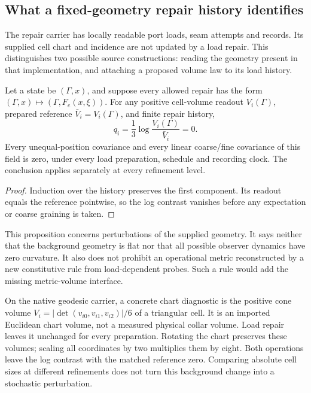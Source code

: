 \subsection{What a fixed-geometry repair history identifies}
\label{subsec:native-geometric-source-identification}

The repair carrier has locally readable port loads, seam attempts and records.
Its supplied cell chart and incidence are not updated by a load repair.
This distinguishes two possible source constructions: reading the geometry
present in that implementation, and attaching a proposed volume law
to its load history.

\begin{proposition}
Let a state be \((\Gamma,x)\), and suppose every allowed repair has the form
\((\Gamma,x)\mapsto(\Gamma,F_e(x,\xi))\). For any positive cell-volume
readout \(V_i(\Gamma)\), prepared reference
\(\bar V_i=V_i(\Gamma)\), and finite repair history,
\[
 q_i=\frac13\log\frac{V_i(\Gamma)}{\bar V_i}=0.
\]
Every unequal-position covariance and every linear coarse/fine covariance of
this field is zero, under every load preparation, schedule and recording
clock. The conclusion applies separately at every refinement level.
\end{proposition}
\begin{proof}
Induction over the history preserves the first component. Its readout equals
the reference pointwise, so the log contrast vanishes before any expectation
or coarse graining is taken.
\end{proof}

This proposition concerns perturbations of the supplied geometry. It says
neither that the background geometry is flat nor that all possible observer
dynamics have zero curvature. It also does not prohibit an operational metric
reconstructed by a new constitutive rule from load-dependent probes. Such a
rule would add the missing metric-volume interface.

On the native geodesic carrier, a concrete chart diagnostic is the positive
cone volume \(V_i=|\det(v_{i0},v_{i1},v_{i2})|/6\) of a triangular cell.
It is an imported Euclidean chart volume, not a measured physical collar
volume. Load repair leaves it unchanged for every preparation. Rotating
the chart preserves these volumes; scaling all coordinates by two multiplies
them by eight. Both operations leave the log contrast with the matched
reference zero. Comparing absolute cell sizes at different refinements does
not turn this background change into a stochastic perturbation.

